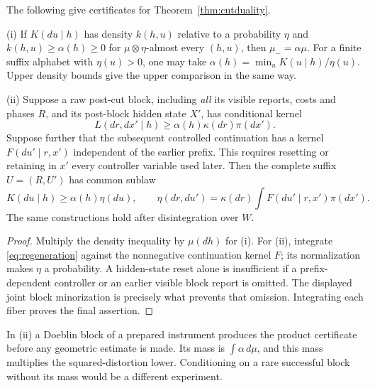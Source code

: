 \begin{lemma}\label{lem:minorization}
The following give certificates for Theorem~\ref{thm:cutduality}.

\textup{(i)} If $K(du\mid h)$ has density $k(h,u)$ relative to a probability $\eta$ and $k(h,u)\ge\alpha(h)\ge0$ for $\mu\otimes\eta$-almost every $(h,u)$, then $\mu_-=\alpha\mu$. For a finite suffix alphabet with $\eta(u)>0$, one may take $\alpha(h)=\min_u K(u\mid h)/\eta(u)$. Upper density bounds give the upper comparison in the same way.

\textup{(ii)} Suppose a raw post-cut block, including \emph{all} its visible reports, costs and phases $R$, and its post-block hidden state $X'$, has conditional kernel
\begin{equation}\label{eq:regeneration}
 L(d r,dx'\mid h)\ge\alpha(h)\kappa(d r)\pi(dx').
\end{equation}
Suppose further that the subsequent controlled continuation has a kernel $F(du'\mid r,x')$ independent of the earlier prefix. This requires resetting or retaining in $x'$ every controller variable used later. Then the complete suffix $U=(R,U')$ has common sublaw
\[
 K(du\mid h)\ge\alpha(h)\eta(du),\qquad
 \eta(dr,du')=\kappa(dr)\int F(du'\mid r,x')\pi(dx').
\]
The same constructions hold after disintegration over $W$.
\end{lemma}
\begin{proof}
Multiply the density inequality by $\mu(dh)$ for (i). For (ii), integrate \eqref{eq:regeneration} against the nonnegative continuation kernel $F$; its normalization makes $\eta$ a probability. A hidden-state reset alone is insufficient if a prefix-dependent controller or an earlier visible block report is omitted. The displayed joint block minorization is precisely what prevents that omission. Integrating each fiber proves the final assertion.
\end{proof}

In (ii) a Doeblin block of a prepared instrument produces the product certificate before any geometric estimate is made. Its mass is $\int\alpha\,d\mu$, and this mass multiplies the squared-distortion lower. Conditioning on a rare successful block without its mass would be a different experiment.

